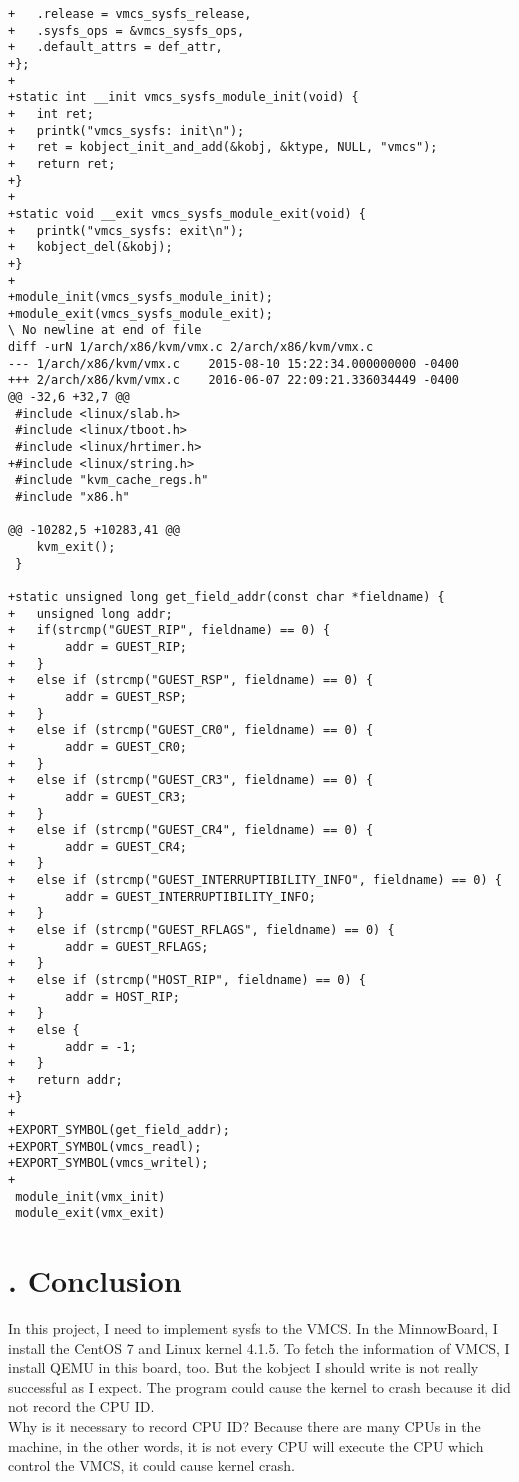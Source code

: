 \documentclass[11pt,draftclsnofoot,onecolumn,letterpaper]{IEEEtran}
\begin{document}
\begin{verbatim}
+   .release = vmcs_sysfs_release,
+   .sysfs_ops = &vmcs_sysfs_ops,
+   .default_attrs = def_attr,
+};
+
+static int __init vmcs_sysfs_module_init(void) {
+   int ret;
+   printk("vmcs_sysfs: init\n");
+   ret = kobject_init_and_add(&kobj, &ktype, NULL, "vmcs");
+   return ret;
+}
+
+static void __exit vmcs_sysfs_module_exit(void) {
+   printk("vmcs_sysfs: exit\n");
+   kobject_del(&kobj);
+} 
+
+module_init(vmcs_sysfs_module_init);
+module_exit(vmcs_sysfs_module_exit);
\ No newline at end of file
diff -urN 1/arch/x86/kvm/vmx.c 2/arch/x86/kvm/vmx.c
--- 1/arch/x86/kvm/vmx.c    2015-08-10 15:22:34.000000000 -0400
+++ 2/arch/x86/kvm/vmx.c    2016-06-07 22:09:21.336034449 -0400
@@ -32,6 +32,7 @@
 #include <linux/slab.h>
 #include <linux/tboot.h>
 #include <linux/hrtimer.h>
+#include <linux/string.h>
 #include "kvm_cache_regs.h"
 #include "x86.h"
 
@@ -10282,5 +10283,41 @@
    kvm_exit();
 }
 
+static unsigned long get_field_addr(const char *fieldname) {
+   unsigned long addr;
+   if(strcmp("GUEST_RIP", fieldname) == 0) {
+       addr = GUEST_RIP;
+   }
+   else if (strcmp("GUEST_RSP", fieldname) == 0) {
+       addr = GUEST_RSP;
+   }
+   else if (strcmp("GUEST_CR0", fieldname) == 0) {
+       addr = GUEST_CR0;
+   }
+   else if (strcmp("GUEST_CR3", fieldname) == 0) {
+       addr = GUEST_CR3;
+   }
+   else if (strcmp("GUEST_CR4", fieldname) == 0) {
+       addr = GUEST_CR4;
+   }
+   else if (strcmp("GUEST_INTERRUPTIBILITY_INFO", fieldname) == 0) {
+       addr = GUEST_INTERRUPTIBILITY_INFO;
+   }
+   else if (strcmp("GUEST_RFLAGS", fieldname) == 0) {
+       addr = GUEST_RFLAGS;
+   }
+   else if (strcmp("HOST_RIP", fieldname) == 0) {
+       addr = HOST_RIP;
+   }
+   else {
+       addr = -1;
+   }
+   return addr;
+}
+
+EXPORT_SYMBOL(get_field_addr);
+EXPORT_SYMBOL(vmcs_readl);
+EXPORT_SYMBOL(vmcs_writel);
+
 module_init(vmx_init)
 module_exit(vmx_exit)

\end{verbatim}

\newpage
\section*{\large{\uppercase\expandafter{}. Conclusion}}
In this project, I need to implement sysfs to the VMCS. In the MinnowBoard, I install the CentOS 7 and Linux kernel 4.1.5. To fetch the information of VMCS, I install QEMU in this board, too. But the kobject I should write is not really successful as I expect. The program could cause the kernel to crash because it did not record the CPU ID.\\
Why is it necessary to record CPU ID? Because there are many CPUs in the machine, in the other words, it is not every CPU will execute the CPU which control the VMCS, it could cause kernel crash.
\end{document}
